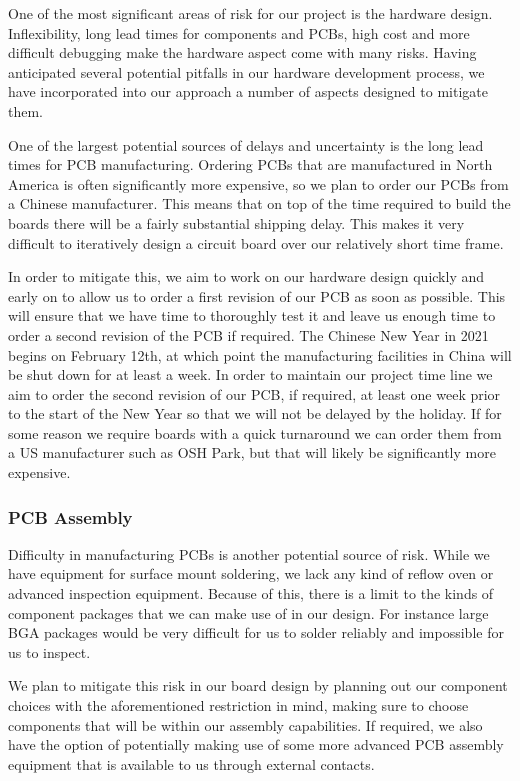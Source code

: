 One of the most significant areas of risk for our project is the hardware
design. Inflexibility, long lead times for components and PCBs, high cost and
more difficult debugging make the hardware aspect come with many risks. Having
anticipated several potential pitfalls in our hardware development process, we
have incorporated into our approach a number of aspects designed to mitigate
them.

One of the largest potential sources of delays and uncertainty is the long lead
times for PCB manufacturing. Ordering PCBs that are manufactured in North
America is often significantly more expensive, so we plan to order our PCBs from
a Chinese manufacturer. This means that on top of the time required to build the
boards there will be a fairly substantial shipping delay. This makes it very
difficult to iteratively design a circuit board over our relatively short
time frame.

In order to mitigate this, we aim to work on our hardware design quickly and
early on to allow us to order a first revision of our PCB as soon as possible. This
will ensure that we have time to thoroughly test it and leave us enough time to
order a second revision of the PCB if required. The Chinese New Year in 2021
begins on February 12th, at which point the manufacturing facilities in China
will be shut down for at least a week. In order to maintain our project time
line we aim to order the second revision of our PCB, if required, at least one
week prior to the start of the New Year so that we will not be delayed by the
holiday. If for some reason we require boards with a quick turnaround we can
order them from a US manufacturer such as OSH Park, but that will likely be
significantly more expensive.

\subsubsection{PCB Assembly}

Difficulty in manufacturing PCBs is another potential source of risk.  While we
have equipment for surface mount soldering, we lack any kind of reflow oven or
advanced inspection equipment.  Because of this, there is a limit to the kinds
of component packages that we can make use of in our design.  For instance large
BGA packages would be very difficult for us to solder reliably and impossible
for us to inspect.

We plan to mitigate this risk in our board design by planning out our component
choices with the aforementioned restriction in mind, making sure to choose
components that will be within our assembly capabilities.  If required, we also
have the option of potentially making use of some more advanced PCB assembly
equipment that is available to us through external contacts.


